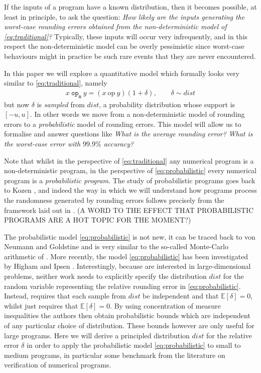\documentclass[10pt,conference]{IEEEtran}
\newcommand{\mop}{\mathtt{op_m}}
\newcommand{\iop}{\mathrm{op}}
\newcommand{\Exp}[1]{\mathbb{E}\left[#1\right]}
\begin{document}
If the inputs of a program have a known distribution, then it becomes possible, at least in principle, to ask the question: \textit{How likely are the inputs generating the worst-case rounding errors obtained from the non-deterministic model of \cref{eq:traditional}?} Typically, these inputs will occur very infrequently, and in this respect the non-deterministic model can be overly pessimistic since worst-case behaviours might in practice be such rare events that they are never encountered. 

In this paper we will explore a quantitative model which formally looks very similar to \cref{eq:traditional}, namely
\begin{align}
x~\mop~y=(x~\iop~y)(1+\delta), \qquad\delta\sim dist \label{eq:probabilistic}
\end{align}
but now $\delta$ is \emph{sampled} from $dist$, a probability distribution whose support is $\left[-u,u\right]$. In other words we move from a non-deterministic model of rounding errors to a \emph{probabilistic} model of rounding errors. This model will allow us to formalise and answer questions like \textit{What is the average rounding error?} \textit{What is the worst-case error with $99.9\%$ accuracy?}

Note that whilst in the perspective of \eqref{eq:traditional} any numerical program is a non-deterministic program, in the perspective of \cref{eq:probabilistic} every numerical program is a \emph{probabilistic program}. The study of probabilistic programs goes back to Kozen \cite{K81c}, and indeed the way in which we will understand how programs process the randomness generated by rounding errors follows precisely from the framework laid out in \cite{K81c}. (A WORD TO THE EFFECT THAT PROBABILISTIC PROGRAMS ARE A HOT TOPIC FOR THE MOMENT?)

The probabilistic model \cref{eq:probabilistic} is not new, it can be traced back to von Neumann and Goldstine \cite{von1947numerical} and is very similar to the so-called Monte-Carlo arithmetic of \cite{parker1997monte}. More recently, the model \cref{eq:probabilistic} has been investigated by Higham \cite{higham2019new}
and Ipsen \cite{ipsen2019probabilistic}. Interestingly, because \cite{higham2019new,ipsen2019probabilistic} are interested in large-dimensional problems, neither work needs to explicitly specify the distribution $dist$ for the random variable representing the relative rounding error in \cref{eq:probabilistic}. Instead, \cite{higham2019new} requires that each sample from $dist$ be independent and that $\Exp{\delta}=0$, whilst \cite{ipsen2019probabilistic} just requires that $\Exp{\delta}=0$. By using concentration of measure inequalities the authors then obtain probabilistic bounds which are independent of any particular choice of distribution. 
These bounds however are only useful for large programs. Here we will derive a principled distribution $dist$ for the relative error $\delta$ in order to apply the probabilistic model \cref{eq:probabilistic} to small to medium programs, in particular some benchmark from the literature on verification of numerical programs.
\end{document}

